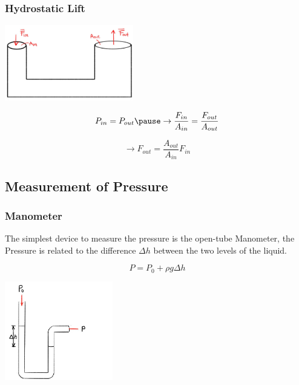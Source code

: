 \documentclass[]{beamer}
\begin{document}


\begin{frame}
\frametitle{Hydrostatic Lift}



 \begin{center}
  \includegraphics[height=1.3in]{images2/hydrolift.jpg}
\end{center}


\begin{equation}
P_{in}=P_{out} \pause \rightarrow\frac{F_{in}}{A_{in}}=\frac{F_{out}}{A_{out}}
\end{equation}


\begin{equation}
\rightarrow F_{out}=\frac{A_{out}}{A_{in}}F_{in}
\end{equation}


  \end{frame}

\subsection{Measurement of Pressure}
\begin{frame}
\frametitle{Manometer}

The simplest device to measure the pressure  is the open-tube Manometer,  the Pressure is related to the difference $ \Delta h$ between the two levels of the  liquid.


\begin{equation*}
P=P_0+\rho g \Delta h
\end{equation*} 

  \begin{center}
  \includegraphics[height=1.7in]{images2/manometer.jpg}
\end{center}


  \end{frame}
\end{document}
